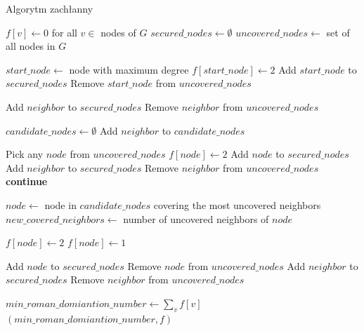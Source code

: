     \begin{algorithm}
    \caption*{Algorytm zachłanny}
    \begin{algorithmic}[1]
        \State $f[v] \gets 0$ for all $v \in$ nodes of $G$
        \State $secured\_nodes \gets \emptyset$
        \State $uncovered\_nodes \gets$ set of all nodes in $G$

        \State $start\_node \gets$ node with maximum degree
        \State $f[start\_node] \gets 2$
        \State Add $start\_node$ to $secured\_nodes$
        \State Remove $start\_node$ from $uncovered\_nodes$
        
            \State Add $neighbor$ to $secured\_nodes$
            \State Remove $neighbor$ from $uncovered\_nodes$
        \EndFor

            \State $candidate\_nodes \gets \emptyset$
                        \State Add $neighbor$ to $candidate\_nodes$
                    \EndIf
                \EndFor
            \EndFor

                \State Pick any $node$ from $uncovered\_nodes$
                \State $f[node] \gets 2$
                \State Add $node$ to $secured\_nodes$
                    \State Add $neighbor$ to $secured\_nodes$
                    \State Remove $neighbor$ from $uncovered\_nodes$
                \EndFor
                \State \textbf{continue}
            \EndIf

            \State $node \gets$ node in $candidate\_nodes$ covering the most uncovered neighbors
            \State $new\_covered\_neighbors \gets$ number of uncovered neighbors of $node$

                \State $f[node] \gets 2$
            \Else
                \State $f[node] \gets 1$
            \EndIf

            \State Add $node$ to $secured\_nodes$
            \State Remove $node$ from $uncovered\_nodes$
                \State Add $neighbor$ to $secured\_nodes$
                \State Remove $neighbor$ from $uncovered\_nodes$
            \EndFor
        \EndWhile

        \State $min\_roman\_domiantion\_number \gets \sum_{v} f[v]$
        \State \Return $(min\_roman\_domiantion\_number, f)$
        \EndFunction
    \end{algorithmic}
\end{algorithm}
